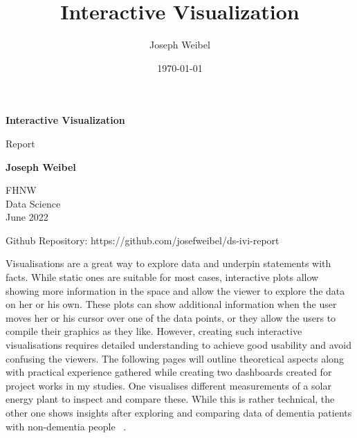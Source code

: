 \documentclass[11pt]{article}
\title{Interactive Visualization}
\author{Joseph Weibel}
\date{\today}
\begin{document}
\begin{titlepage}
    \begin{center}
        \vspace*{0.4cm}

        \Huge
        \textbf{Interactive Visualization}

        \vspace{0.3cm}
        \LARGE
        Report

        \vspace{0.8cm}

        \textbf{Joseph Weibel}

        \vfill


        \vfill

        \vspace{0.3cm}

        \Large
        FHNW\\
        Data Science\\
        June 2022

        \vspace{1.0cm}

        \normalsize
        Github Repository: https://github.com/josefweibel/ds-ivi-report

        \vspace{0.8cm}

    \end{center}
\end{titlepage}
\pagebreak

\tableofcontents
\pagebreak

Visualisations are a great way to explore data and underpin statements with facts. While static ones are suitable for most cases, interactive plots allow showing more information in the space and allow the viewer to explore the data on her or his own. These plots can show additional information when the user moves her or his cursor over one of the data points, or they allow the users to compile their graphics as they like. However, creating such interactive visualisations requires detailed understanding to achieve good usability and avoid confusing the viewers. The following pages will outline theoretical aspects along with practical experience gathered while creating two dashboards created for project works in my studies. One visualises different measurements of a solar energy plant to inspect and compare these. While this is rather technical, the other one shows insights after exploring and comparing data of dementia patients with non-dementia people ~\cite{alzheimers_disease_neuroimaging_initiative_adni_2022}.
\end{document}
